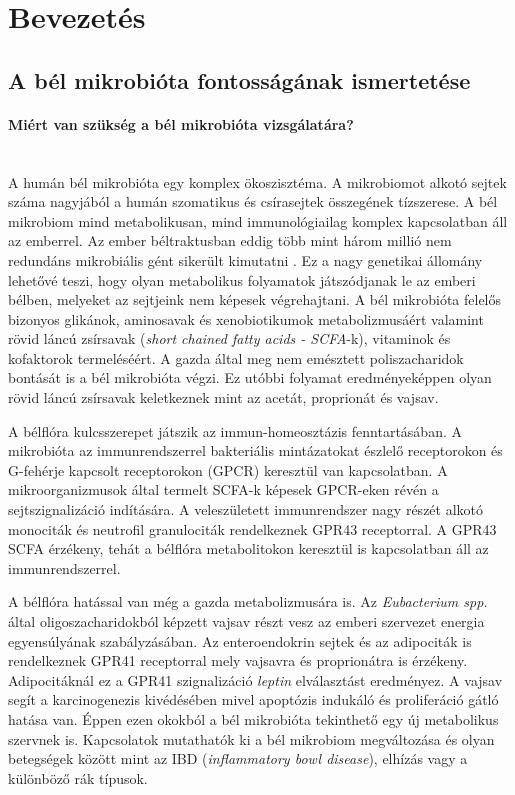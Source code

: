 \documentclass[a4paper,12pt]{article}
\begin{document}
		\pagebreak

\section{Bevezetés}
	\subsection{A bél mikrobióta fontosságának ismertetése}
		\paragraph{Miért van szükség a bél mikrobióta vizsgálatára?} \mbox{}\\
		A humán bél mikrobióta egy komplex ökoszisztéma. A mikrobiomot alkotó sejtek száma nagyjából a humán szomatikus és csírasejtek összegének tízszerese.  A bél mikrobiom mind metabolikusan, mind immunológiailag komplex kapcsolatban áll az emberrel.\cite{gut_microbiome} Az ember béltraktusban eddig több mint három millió nem redundáns mikrobiális gént sikerült kimutatni \cite{meta_omics}. Ez a nagy genetikai állomány lehetővé teszi, hogy olyan metabolikus folyamatok játszódjanak le az emberi bélben, melyeket az sejtjeink nem képesek végrehajtani. \cite{gut_microbiome} A bél mikrobióta felelős bizonyos glikánok, aminosavak és xenobiotikumok metabolizmusáért valamint rövid láncú zsírsavak (\textit{short chained fatty acids - SCFA}-k), vitaminok és kofaktorok termeléséért. A gazda által meg nem emésztett poliszacharidok bontását is a bél mikrobióta végzi. Ez utóbbi folyamat eredményeképpen olyan rövid láncú zsírsavak keletkeznek mint az acetát, proprionát és vajsav. \cite{scfa_and_vitamine}
		
		A bélflóra kulcsszerepet játszik az immun-homeosztázis fenntartásában. A mikrobióta az immunrendszerrel bakteriális mintázatokat észlelő receptorokon és G-fehérje kapcsolt receptorokon (GPCR) keresztül van kapcsolatban. A mikroorganizmusok által termelt SCFA-k képesek GPCR-eken révén a sejtszignalizáció indítására. A veleszületett immunrendszer nagy részét alkotó monociták és neutrofil granulociták rendelkeznek GPR43 receptorral. A GPR43 SCFA érzékeny, tehát a bélflóra metabolitokon keresztül is kapcsolatban áll az immunrendszerrel. \cite{buthyrate_immune}
		
		A bélflóra hatással van még a gazda metabolizmusára is.  Az \textit{Eubacterium spp.} által oligoszacharidokból képzett vajsav részt vesz az emberi szervezet energia egyensúlyának szabályzásában. \cite{gut_microbiome} Az enteroendokrin sejtek és az adipociták is rendelkeznek GPR41 receptorral mely vajsavra és proprionátra is érzékeny. Adipocitáknál ez a GPR41 szignalizáció \textit{leptin} elválasztást eredményez. \cite{buthyrate_immune} A vajsav segít a karcinogenezis kivédésében mivel apoptózis indukáló és proliferáció gátló hatása van. Éppen ezen okokból a bél mikrobióta tekinthető egy új metabolikus szervnek is. \cite{host_bacterial_mutualism} Kapcsolatok mutathatók ki a bél mikrobiom megváltozása és olyan betegségek között mint az IBD (\textit{inflammatory bowl disease}), elhízás vagy a különböző rák típusok. \cite{gut_microbiome}
		
\end{document}
